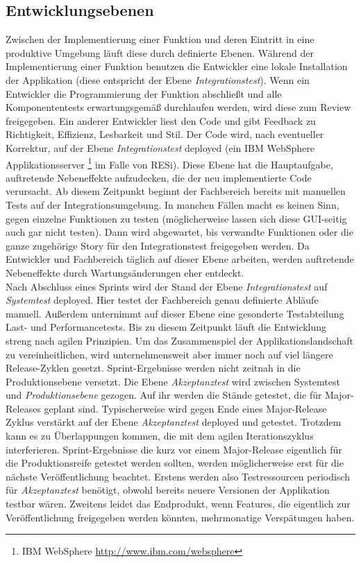 \subsection{Entwicklungsebenen}
Zwischen der Implementierung einer Funktion und deren Eintritt in eine produktive Umgebung läuft diese durch definierte Ebenen. Während der Implementierung einer Funktion benutzen die Entwickler eine lokale Installation der Applikation (diese entspricht der Ebene \textit{Integrationstest}). Wenn ein Entwickler die Programmierung der Funktion abschließt und alle Komponententests erwartungsgemäß durchlaufen werden, wird diese zum \gls{Review} freigegeben. Ein anderer Entwickler liest den Code und gibt Feedback zu Richtigkeit, Effizienz, Lesbarkeit und Stil. Der Code wird, nach eventueller Korrektur, auf der Ebene \textit{Integrationstest} deployed (ein IBM WebSphere Applikationsserver \footnote{IBM WebSphere \url{http://www.ibm.com/websphere}} im Falle von RESi). Diese Ebene hat die Hauptaufgabe, auftretende Nebeneffekte aufzudecken, die der neu implementierte Code verursacht. Ab diesem Zeitpunkt beginnt der Fachbereich bereits mit manuellen Tests auf der Integrationsumgebung. In manchen Fällen macht es keinen Sinn, gegen einzelne Funktionen zu testen (möglicherweise lassen sich diese GUI-seitig auch gar nicht testen). Dann wird abgewartet, bis verwandte Funktionen oder die ganze zugehörige Story für den Integrationstest freigegeben werden. Da Entwickler und Fachbereich täglich auf dieser Ebene arbeiten, werden auftretende Nebeneffekte durch Wartungsänderungen eher entdeckt.\\
Nach Abschluss eines Sprints wird der Stand der Ebene \textit{Integrationstest} auf \textit{Systemtest} deployed. Hier testet der Fachbereich genau definierte Abläufe manuell. Außerdem unternimmt auf dieser Ebene eine gesonderte Testabteilung Last- und Performancetests. Bis zu diesem Zeitpunkt läuft die Entwicklung streng nach agilen Prinzipien. Um das Zusammenspiel der Applikationslandschaft zu vereinheitlichen, wird unternehmensweit aber immer noch auf viel längere Release-Zyklen gesetzt. Sprint-Ergebnisse werden nicht zeitnah in die Produktionsebene versetzt. Die Ebene \textit{Akzeptanztest} wird zwischen Systemtest und \textit{Produktionsebene} gezogen. Auf ihr werden die Stände getestet, die für Major-Releases geplant sind. Typischerweise wird gegen Ende eines Major-Release Zyklus verstärkt auf der Ebene \textit{Akzeptanztest} deployed und getestet. Trotzdem kann es zu Überlappungen kommen, die mit dem agilen Iterationszyklus interferieren. Sprint-Ergebnisse die kurz vor einem Major-Release eigentlich für die Produktionsreife getestet werden sollten, werden möglicherweise erst für die nächste Veröffentlichung beachtet. Erstens werden also Testressourcen periodisch für \textit{Akzeptanztest} benötigt, obwohl bereits neuere Versionen der Applikation testbar wären. Zweitens leidet das Endprodukt, wenn Features, die eigentlich zur Veröffentlichung freigegeben werden könnten, mehrmonatige Verspätungen haben.

